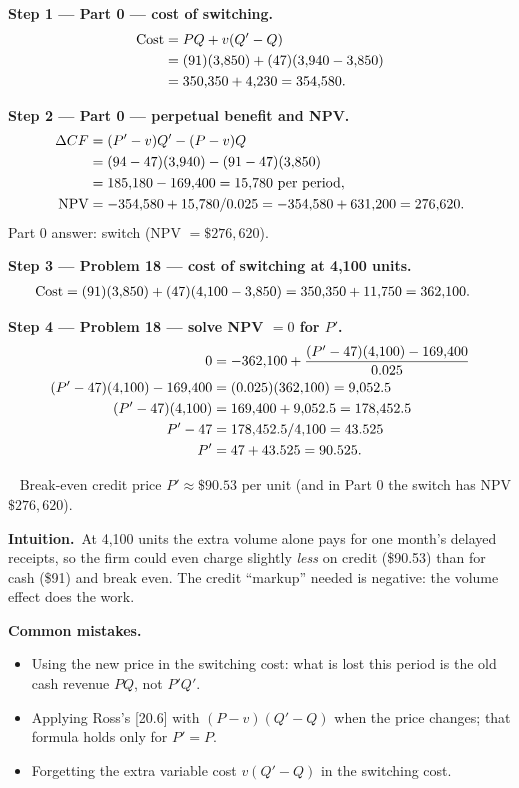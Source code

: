 \documentclass[11pt,a4paper]{article}
\newcommand{\step}[2]{\par\medskip\noindent\textbf{Step #1 --- #2.}~}
\newcommand{\intuition}{\par\medskip\noindent\textbf{Intuition.}~}
\newcommand{\answer}[1]{\par\smallskip\noindent\fbox{\textbf{Answer #1.}}~}
\newcommand{\pitfalls}{\par\medskip\noindent\textbf{Common mistakes.}}
\begin{document}
\step{1}{Part 0 --- cost of switching}
\begin{align}
  \text{Cost} &= PQ + v(Q' - Q) \label{r5be14-cost}\\
  &= (91)(3{,}850) + (47)(3{,}940 - 3{,}850) \notag\\
  &= 350{,}350 + 4{,}230 = 354{,}580. \notag
\end{align}

\step{2}{Part 0 --- perpetual benefit and NPV}
\begin{align}
  \Delta CF &= (P' - v)Q' - (P - v)Q \notag\\
  &= (94 - 47)(3{,}940) - (91 - 47)(3{,}850) \notag\\
  &= 185{,}180 - 169{,}400 = 15{,}780 \ \text{per period}, \notag\\
  \text{NPV} &= -354{,}580 + 15{,}780/0.025 = -354{,}580 + 631{,}200 = 276{,}620. \label{r5be14-npv0}
\end{align}
Part 0 answer: switch (NPV $= \$276{,}620$).

\step{3}{Problem 18 --- cost of switching at 4{,}100 units}
\begin{align}
  \text{Cost} &= (91)(3{,}850) + (47)(4{,}100 - 3{,}850) = 350{,}350 + 11{,}750 = 362{,}100. \notag
\end{align}

\step{4}{Problem 18 --- solve NPV $= 0$ for $P'$}
\begin{align}
  0 &= -362{,}100 + \frac{(P' - 47)(4{,}100) - 169{,}400}{0.025} \notag\\
  (P' - 47)(4{,}100) - 169{,}400 &= (0.025)(362{,}100) = 9{,}052.5 \notag\\
  (P' - 47)(4{,}100) &= 169{,}400 + 9{,}052.5 = 178{,}452.5 \notag\\
  P' - 47 &= 178{,}452.5/4{,}100 = 43.525 \notag\\
  P' &= 47 + 43.525 = 90.525. \label{r5be14-p}
\end{align}

\answer{\unskip} Break-even credit price $P' \approx \$90.53$ per unit (and in Part 0 the switch has NPV
$\$276{,}620$).

\intuition At 4{,}100 units the extra volume alone pays for one month's delayed receipts, so the
firm could even charge slightly \emph{less} on credit (\$90.53) than for cash (\$91) and break even.
The credit ``markup'' needed is negative: the volume effect does the work.

\pitfalls
\begin{itemize}
  \item Using the new price in the switching cost: what is lost this period is the old cash
        revenue $PQ$, not $P'Q'$.
  \item Applying Ross's [20.6] with $(P - v)(Q' - Q)$ when the price changes; that formula holds
        only for $P' = P$.
  \item Forgetting the extra variable cost $v(Q' - Q)$ in the switching cost.
\end{itemize}
\end{document}
